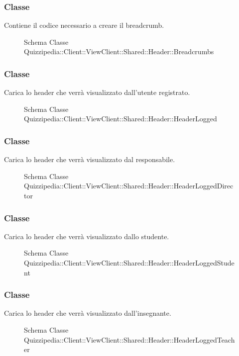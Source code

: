 \subsubsection{Classe }
Contiene il codice necessario a creare il breadcrumb.
\begin{figure}[H]
\centering
\noindent{}
\caption[Schema Classe Breadcrumbs]{Schema Classe Quizzipedia::Client::ViewClient::Shared::Header::Breadcrumbs}
\end{figure}
\subsubsection{Classe }
Carica lo header che verrà visualizzato dall'utente registrato.
\begin{figure}[H]
\centering
\noindent{}
\caption[Schema Classe HeaderLogged]{Schema Classe Quizzipedia::Client::ViewClient::Shared::Header::HeaderLogged}
\end{figure}
\subsubsection{Classe }
Carica lo header che verrà visualizzato dal responsabile.
\begin{figure}[H]
\centering
\noindent{}
\caption[Schema Classe HeaderLoggedDirector]{Schema Classe Quizzipedia::Client::ViewClient::Shared::Header::HeaderLoggedDirector}
\end{figure}
\subsubsection{Classe }
Carica lo header che verrà visualizzato dallo studente.
\begin{figure}[H]
\centering
\noindent{}
\caption[Schema Classe HeaderLoggedStudent]{Schema Classe Quizzipedia::Client::ViewClient::Shared::Header::HeaderLoggedStudent}
\end{figure}
\subsubsection{Classe }
Carica lo header che verrà visualizzato dall'insegnante.
\begin{figure}[H]
\centering
\noindent{}
\caption[Schema Classe HeaderLoggedTeacher]{Schema Classe Quizzipedia::Client::ViewClient::Shared::Header::HeaderLoggedTeacher}
\end{figure}
